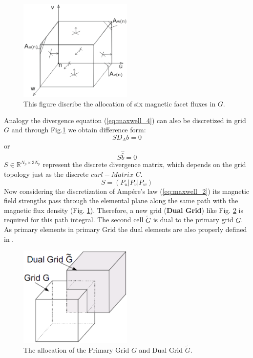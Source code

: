 \begin{figure}[!ht]
\centering
\includegraphics[width=0.5\textwidth]{bilder/divergence_in_grid}
\caption{This figure discribe the allocation of six magnetic facet fluxes in $G$.}
\label{fig:divergence_G}
\end{figure}
Analogy the divergence equation (\ref{eq:maxwell_4}) can also be discretized in grid $G$ and through Fig.\ref{fig:divergence_G} we obtain difference form: 
\begin{equation}
SD_{A}b=0
\label{eq:divergence_sample}
\end{equation}
or
\begin{equation}
S\widehat{\widehat{b}}=0
\label{eq:divergence_integral}
\end{equation}
$S\in \mathbb{R}^{N_{p}\times 3N_{p}}$ represent the discrete divergence matrix, which depends on the grid topology just as the discrete $curl-Matrix$ $C$.
\begin{equation}
S=(P_{u}|P_{v}|P_{w})
\label{eq:S_matrix}
\end{equation}
Now considering the discretization of Amp\'ere's law (\ref{eq:maxwell_2}) its magnetic field strengths pass through the elemental plane along the same path with the magnetic flux density (Fig. \ref{fig:divergence_G}). Therefore, a new grid (\textbf{Dual Grid}) like Fig. \ref{fig:dual_grid} is required for this path integral. The second cell $\tilde{G}$ is dual to the primary grid $G$. As primary elements in primary Grid the dual elements are also properly defined in \cite{script_FeldSim}.
\begin{figure}[!ht]
\centering
\includegraphics[width=0.5\textwidth]{bilder/dual_grid}
\caption{The allocation of the Primary Grid $G$ and Dual Grid $\tilde{G}$\cite{FIT_discrete_electrommagnetism}.}
\label{fig:dual_grid}
\end{figure}
